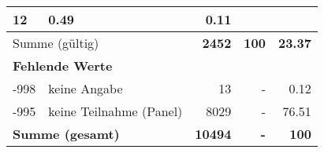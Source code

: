 \begin{longtable}{lXrrr}
       \num{12} &
       \num[round-mode=places,round-precision=2]{0,49} &
         \num[round-mode=places,round-precision=2]{0,11} \\
     \midrule
     \multicolumn{2}{l}{Summe (gültig)} &
       \textbf{\num{2452}} &
     \textbf{100} &
       \textbf{\num[round-mode=places,round-precision=2]{23,37}} \\
     \multicolumn{5}{l}{\textbf{Fehlende Werte}}\\
       -998 &
       keine Angabe &
         \num{13} &
        - &
         \num[round-mode=places,round-precision=2]{0,12} \\
       -995 &
       keine Teilnahme (Panel) &
         \num{8029} &
        - &
         \num[round-mode=places,round-precision=2]{76,51} \\
     \midrule
     \multicolumn{2}{l}{\textbf{Summe (gesamt)}} &
          \textbf{\num{10494}} &
        \textbf{-} &
        \textbf{100} \\
     \bottomrule
     \end{longtable}
     

